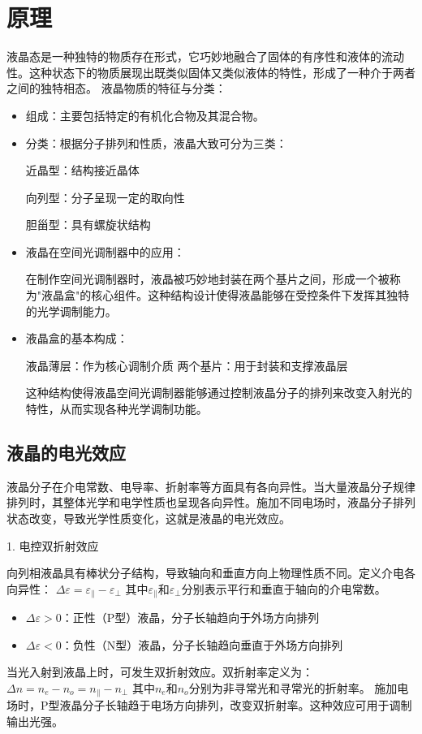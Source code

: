 \documentclass[11pt,a4paper]{article}
\begin{document}
\section{原理}
液晶态是一种独特的物质存在形式，它巧妙地融合了固体的有序性和液体的流动性。这种状态下的物质展现出既类似固体又类似液体的特性，形成了一种介于两者之间的独特相态。
液晶物质的特征与分类：
\begin{itemize}
\item 组成：主要包括特定的有机化合物及其混合物。
\item 分类：根据分子排列和性质，液晶大致可分为三类：

近晶型：结构接近晶体

向列型：分子呈现一定的取向性

胆甾型：具有螺旋状结构


\item 液晶在空间光调制器中的应用：

在制作空间光调制器时，液晶被巧妙地封装在两个基片之间，形成一个被称为"液晶盒"的核心组件。这种结构设计使得液晶能够在受控条件下发挥其独特的光学调制能力。
\item 液晶盒的基本构成：

液晶薄层：作为核心调制介质
两个基片：用于封装和支撑液晶层

这种结构使得液晶空间光调制器能够通过控制液晶分子的排列来改变入射光的特性，从而实现各种光学调制功能。
\end{itemize}
\subsection{液晶的电光效应}
液晶分子在介电常数、电导率、折射率等方面具有各向异性。当大量液晶分子规律排列时，其整体光学和电学性质也呈现各向异性。施加不同电场时，液晶分子排列状态改变，导致光学性质变化，这就是液晶的电光效应。

1. 电控双折射效应

向列相液晶具有棒状分子结构，导致轴向和垂直方向上物理性质不同。定义介电各向异性：
$\Delta\varepsilon = \varepsilon_\parallel - \varepsilon_\perp$
其中$\varepsilon_\parallel$和$\varepsilon_\perp$分别表示平行和垂直于轴向的介电常数。
\begin{itemize}
\item $\Delta\varepsilon > 0$：正性（P型）液晶，分子长轴趋向于外场方向排列
\item $\Delta\varepsilon < 0$：负性（N型）液晶，分子长轴趋向垂直于外场方向排列
\end{itemize}
当光入射到液晶上时，可发生双折射效应。双折射率定义为：
$\Delta n = n_e - n_o = n_\parallel - n_\perp$
其中$n_e$和$n_o$分别为非寻常光和寻常光的折射率。
施加电场时，P型液晶分子长轴趋于电场方向排列，改变双折射率。这种效应可用于调制输出光强。
\end{document}
